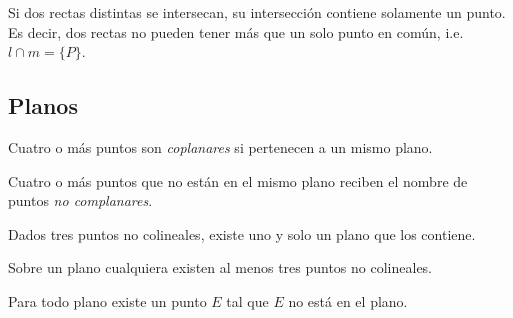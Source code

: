 \clearpage

\begin{theorem}

Si dos rectas distintas se intersecan, su intersección contiene solamente un punto. Es decir, dos rectas no pueden tener más que un solo punto en común, i.e. $l \cap m = \{P\}$.

    \begin{figure}[!h]
        \centering
        
        \label{fig:postulate19}
    \end{figure}
    
\end{theorem}

\clearpage

\subsection{Planos}

\begin{definition}
Cuatro o más puntos son \textit{coplanares} si pertenecen a un mismo plano.
\end{definition}

\begin{definition}
Cuatro o más puntos que no están en el mismo plano reciben el nombre de puntos \textit{no complanares}.
\end{definition}

\begin{postulate}
    Dados tres puntos no colineales, existe uno y solo un plano que los contiene.
    
    \begin{figure}[!h]
        \centering
        
        \label{fig:postulate5}
    \end{figure}
\end{postulate}

\begin{postulate}
    Sobre un plano cualquiera existen al menos tres puntos no colineales.
    
    \begin{figure}[!h]
        \centering
        
        \label{fig:postulate6}
    \end{figure}
\end{postulate}

\begin{postulate}
    Para todo plano existe un punto $E$ tal que $E$ no está en el plano.
    
    \begin{figure}[!h]
        \centering
        
        \label{fig:postulate7}
    \end{figure}
\end{postulate}

